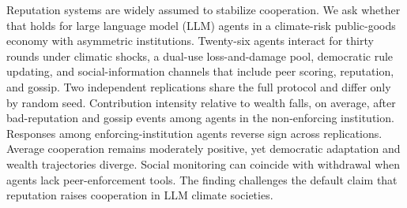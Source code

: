 Reputation systems are widely assumed to stabilize cooperation.
We ask whether that holds for large language model (LLM) agents in a climate-risk public-goods economy with asymmetric institutions.
Twenty-six agents interact for thirty rounds under climatic shocks, a dual-use loss-and-damage pool, democratic rule updating, and social-information channels that include peer scoring, reputation, and gossip.
Two independent replications share the full protocol and differ only by random seed.
Contribution intensity relative to wealth falls, on average, after bad-reputation and gossip events among agents in the non-enforcing institution.
Responses among enforcing-institution agents reverse sign across replications.
Average cooperation remains moderately positive, yet democratic adaptation and wealth trajectories diverge.
Social monitoring can coincide with withdrawal when agents lack peer-enforcement tools.
The finding challenges the default claim that reputation raises cooperation in LLM climate societies.
